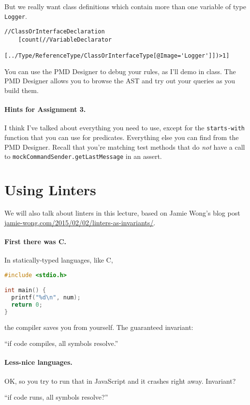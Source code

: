 \documentclass[11pt]{article}
\begin{document}
But we really want class definitions which contain more than one 
variable of type {\tt Logger}. 
\noindent
{\small \begin{verbatim}
//ClassOrInterfaceDeclaration
    [count(//VariableDeclarator
      [../Type/ReferenceType/ClassOrInterfaceType[@Image='Logger']])>1]
\end{verbatim}

You can use the PMD Designer to debug your rules, as I'll demo in class. The PMD Designer allows you to browse the AST and try out your queries as you build them.

\paragraph{Hints for Assignment 3.} I think I've talked about everything you need to use, except for the {\tt starts-with} function that you can use for predicates. Everything else you can find from the PMD Designer. Recall that you're matching test methods that do \emph{not} have a call to {\tt mockCommandSender.getLastMessage} in an assert.

\section*{Using Linters}
We will also talk about linters in this lecture, based on Jamie Wong's blog post \url{jamie-wong.com/2015/02/02/linters-as-invariants/}.

\paragraph{First there was C.}
In statically-typed languages, like C,
\begin{lstlisting}[language=C]
#include <stdio.h>

int main() {
  printf("%d\n", num);
  return 0;
}
\end{lstlisting}
the compiler saves you from yourself.
The guaranteed invariant:
\begin{center}
``if code compiles, all symbols resolve.''
\end{center}

\paragraph{Less-nice languages.}
OK, so you try to run that in JavaScript and it crashes right away.
Invariant?
\begin{center}
 ``if code runs, all symbols resolve?''
\end{center}

}
\end{document}
